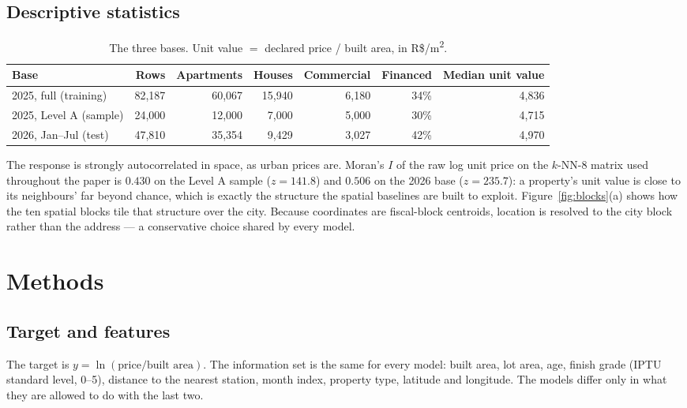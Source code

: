 \documentclass[11pt,a4paper]{article}
\newcommand{\Rsqm}{R\$/m\textsuperscript{2}}
\begin{document}
\subsection{Descriptive statistics}

\begin{table}[h]
\centering\small
\caption{The three bases. Unit value $=$ declared price / built area, in \Rsqm.}
\label{tab:data}
\footnotesize
\begin{tabular}{lrrrrrr}
\toprule
Base & Rows & Apartments & Houses & Commercial & Financed & Median unit value \\
\midrule
2025, full (training) & 82{,}187 & 60{,}067 & 15{,}940 & 6{,}180 & 34\% & 4{,}836 \\
2025, Level A (sample) & 24{,}000 & 12{,}000 & 7{,}000 & 5{,}000 & 30\% & 4{,}715 \\
2026, Jan--Jul (test) & 47{,}810 & 35{,}354 & 9{,}429 & 3{,}027 & 42\% & 4{,}970 \\
\bottomrule
\end{tabular}
\end{table}

The response is strongly autocorrelated in space, as urban prices are. Moran's $I$ of the raw
log unit price on the $k$-NN-8 matrix used throughout the paper is $0.430$ on the Level A sample
($z = 141.8$) and $0.506$ on the 2026 base ($z = 235.7$): a property's unit value is close to its
neighbours' far beyond chance, which is exactly the structure the spatial baselines are built to
exploit. Figure~\ref{fig:blocks}(a) shows how the ten spatial blocks tile that structure over the
city. Because coordinates are fiscal-block centroids, location is resolved to the city block rather
than the address --- a conservative choice shared by every model.

\section{Methods}
\label{sec:methods}

\subsection{Target and features}

The target is $y = \ln(\text{price}/\text{built area})$. The information set is the same for
every model: built area, lot area, age, finish grade (IPTU standard level, 0--5), distance to
the nearest station, month index, property type, latitude and longitude. The models differ only
in what they are allowed to do with the last two.
\end{document}
